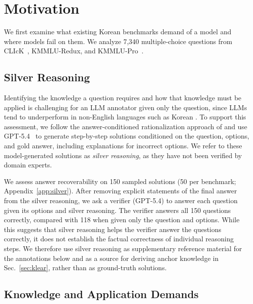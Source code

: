 \section{Motivation}
\label{sec:motivation}

We first examine what existing Korean benchmarks demand of a model and where models fail on them.
We analyze 7,340 multiple-choice questions from CLIcK~\citep{kim2024click}, KMMLU-Redux, and KMMLU-Pro~\citep{hong-etal-2025-kmmlu}.

\subsection{Silver Reasoning}
\label{sec:silver}

Identifying the knowledge a question requires and how that knowledge must be applied is challenging for an LLM annotator given only the question, since LLMs tend to underperform in non-English languages such as Korean \citep{koo2026emcee}.
To support this assessment, we follow the answer-conditioned rationalization approach of \citet{zelikman2022star} and use GPT-5.4~\citep{openai2026gpt54} to generate step-by-step solutions conditioned on the question, options, and gold answer, including explanations for incorrect options. 
We refer to these model-generated solutions as \textit{silver reasoning}, as they have not been verified by domain experts.

We assess answer recoverability on 150 sampled solutions (50 per benchmark; Appendix~\ref{app:silver}).
After removing explicit statements of the final answer from the silver reasoning, we ask a verifier (GPT-5.4) to answer each question given its options and silver reasoning. 
The verifier answers all 150 questions correctly, compared with 118 when given only the question and options. 
While this suggests that silver reasoning helps the verifier answer the questions correctly, it does not establish the factual correctness of individual reasoning steps.
We therefore use silver reasoning as supplementary reference material for the annotations below and as a source for deriving anchor knowledge in Sec.~\ref{sec:klear}, rather than as ground-truth solutions. 

\subsection{Knowledge and Application Demands}
\label{sec:ka}


